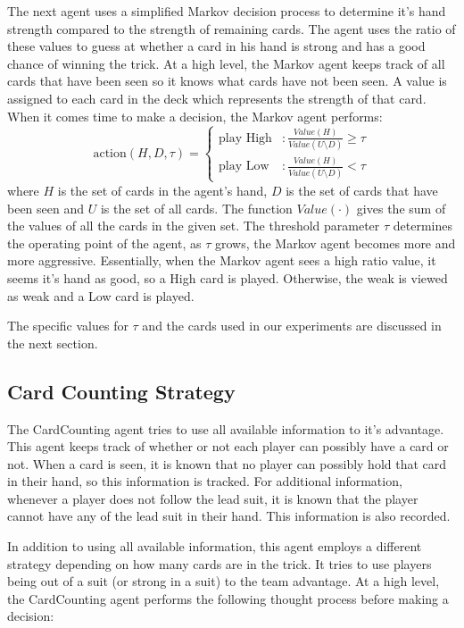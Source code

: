 The next agent uses a simplified Markov decision process to determine it's hand strength compared to the strength of remaining cards.
The agent uses the ratio of these values to guess at whether a card in his hand is strong and has a good chance of winning the trick.
At a high level, the Markov agent keeps track of all cards that have been seen so it knows what cards have not been seen. A value is
assigned to each card in the deck which represents the strength of that card. When it comes time to make a decision, the Markov agent
performs:
\begin{equation}
    \text{action}(H, D, \tau) = \left\{ \begin{array}{lr}
            \text{play High} & : \frac{Value(H)}{Value(U \setminus D)} \geq \tau \\
            \text{play Low}  & : \frac{Value(H)}{Value(U \setminus D)} < \tau 
        \end{array} \right. \nonumber
\end{equation}
where $H$ is the set of cards in the agent's hand, $D$ is the set of cards that have been seen and $U$ is the set of all cards. The function
$Value(\cdot)$ gives the sum of the values of all the cards in the given set. The threshold parameter $\tau$ determines the operating point
of the agent, as $\tau$ grows, the Markov agent becomes more and more aggressive. Essentially, when the Markov agent sees a high ratio value,
it seems it's hand as good, so a High card is played. Otherwise, the weak is viewed as weak and a Low card is played.

The specific values for $\tau$ and the cards used in our experiments are discussed in the next section.


\subsection{Card Counting Strategy}

The CardCounting agent tries to use all available information to it's advantage. This agent keeps track of whether or not each player can
possibly have a card or not. When a card is seen, it is known that no player can possibly hold that card in their hand, so this information
is tracked. For additional information, whenever a player does not follow the lead suit, it is known that the player cannot have any of the
lead suit in their hand. This information is also recorded.

In addition to using all available information, this agent employs a different strategy depending on how many cards are in the trick.
It tries to use players being out of a suit (or strong in a suit) to the team advantage. At a high level, the CardCounting agent performs
the following thought process before making a decision:


